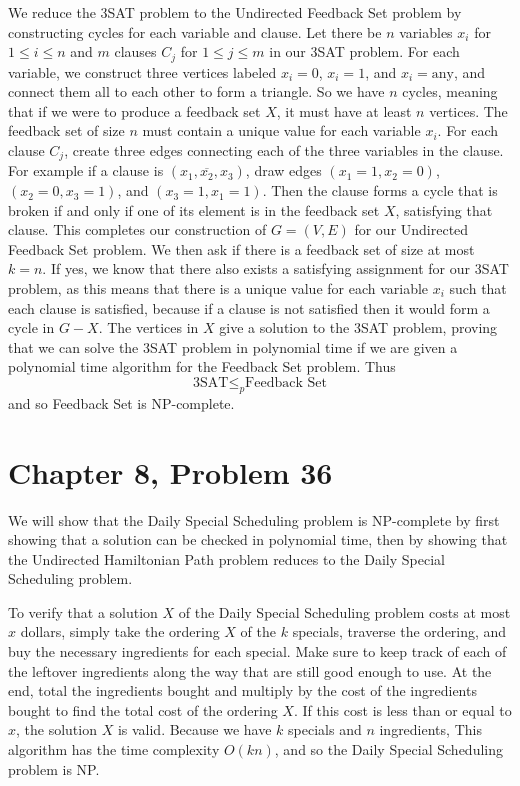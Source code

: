 \documentclass[12pt]{article}
\begin{document}
We reduce the 3SAT problem to the Undirected Feedback Set problem by constructing cycles for each variable and clause. Let there be
\(n\) variables \(x_i\) for \(1\leq i \leq n\) and \(m\) clauses \(C_j\) for \(1\leq j\leq m\) in our 3SAT problem. For each
variable, we construct three vertices labeled \(x_i=0\), \(x_i=1\), and \(x_i=\text{any}\), and connect them all to each other to
form a triangle. So we have \(n\) cycles, meaning that if we were to produce a feedback set \(X\), it must have at least \(n\)
vertices. The feedback set of size \(n\) must contain a unique value for each variable \(x_i\). For each clause \(C_j\), create
three edges connecting each of the three variables in the clause. For example if a clause is \((x_1,\overline{x_2},x_3)\), draw
edges \((x_1=1, x_2=0)\), \((x_2=0, x_3=1)\), and \((x_3=1, x_1=1)\). Then the clause forms a cycle that is broken if and only
if one of its element is in the feedback set \(X\), satisfying that clause. This completes our construction of \(G=(V,E)\) for our
Undirected Feedback Set problem. We then ask if there is a feedback set of size at most \(k=n\). If yes, we know that there also exists a
satisfying assignment for our 3SAT problem, as this means that there is a unique value for each variable \(x_i\) such that each clause
is satisfied, because if a clause is not satisfied then it would form a cycle in \(G-X\). The vertices in \(X\) give a solution to the
3SAT problem, proving that we can solve the 3SAT problem in polynomial time if we are given a polynomial time algorithm for the Feedback
Set problem. Thus
\[\text{3SAT}\leq_p \text{Feedback Set}\]
and so Feedback Set is NP-complete.

\pagebreak

\section*{Chapter 8, Problem 36}

We will show that the Daily Special Scheduling problem is NP-complete by first showing
that a solution can be checked in polynomial time, then by showing that the Undirected Hamiltonian Path problem reduces
to the Daily Special Scheduling problem.

To verify that a solution \(X\) of the Daily Special Scheduling problem costs at most \(x\) dollars, simply take the ordering
\(X\) of the \(k\) specials, traverse the ordering, and buy the necessary ingredients for each special. Make sure to keep track of
each of the leftover ingredients along the way that are still good enough to use. At the end, total the ingredients bought and multiply by the cost
of the ingredients bought to find the total cost of the ordering \(X\). If this cost is less than or equal to \(x\), the solution
\(X\) is valid. Because we have \(k\) specials and \(n\) ingredients, This algorithm has the time complexity \(O(kn)\), and so the Daily
Special Scheduling problem is NP.
\end{document}
